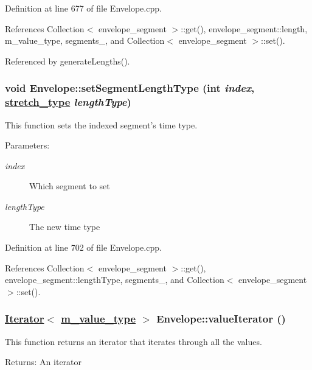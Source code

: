 Definition at line 677 of file Envelope.cpp.

References Collection$<$ envelope\_\-segment $>$::get(), envelope\_\-segment::length, m\_\-value\_\-type, segments\_\-, and Collection$<$ envelope\_\-segment $>$::set().

Referenced by generate\-Lengths().\hypertarget{classEnvelope_a23}{
\subsubsection[setSegmentLengthType]{\setlength{\rightskip}{0pt plus 5cm}void Envelope::set\-Segment\-Length\-Type (int {\em index}, \hyperlink{Types_8h_a12}{stretch\_\-type} {\em length\-Type})}}
\label{classEnvelope_a23}


This function sets the indexed segment's time type. \begin{Desc}
\item[Parameters:]
\begin{description}
\item[{\em index}]Which segment to set \item[{\em length\-Type}]The new time type \end{description}
\end{Desc}


Definition at line 702 of file Envelope.cpp.

References Collection$<$ envelope\_\-segment $>$::get(), envelope\_\-segment::length\-Type, segments\_\-, and Collection$<$ envelope\_\-segment $>$::set().\hypertarget{classEnvelope_a26}{
\subsubsection[valueIterator]{\setlength{\rightskip}{0pt plus 5cm}\hyperlink{classIterator}{Iterator}$<$ \hyperlink{Types_8h_a3}{m\_\-value\_\-type} $>$ Envelope::value\-Iterator ()}}
\label{classEnvelope_a26}


This function returns an iterator that iterates through all the values. \begin{Desc}
\item[Returns:]An iterator \end{Desc}


